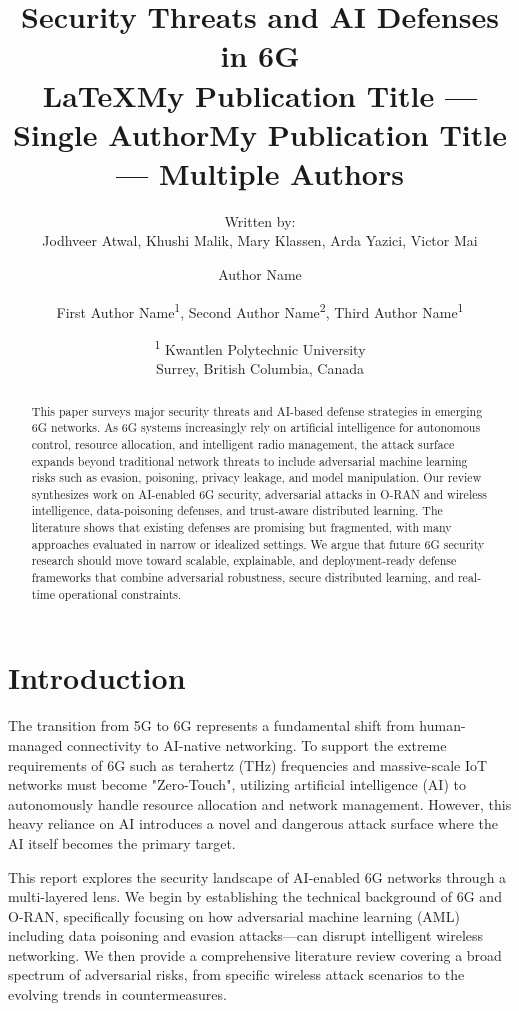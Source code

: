 \documentclass[letterpaper]{article} %
\title{Security Threats and AI Defenses in 6G\\\LaTeX{}}
\author{
    Written by: \\
    Jodhveer Atwal,
    Khushi Malik,
    Mary Klassen,
    Arda Yazici,
    Victor Mai
}
\date{
    \textsuperscript{\rm 1}
}
\title{My Publication Title --- Single Author}
\author {
    Author Name
}
\date{
    Kwantlen Polytechnic University\\
    Surrey, British Columbia, Canada\\
}
\title{My Publication Title --- Multiple Authors}
\author {
    First Author Name\textsuperscript{\rm 1},
    Second Author Name\textsuperscript{\rm 2},
    Third Author Name\textsuperscript{\rm 1}
}
\begin{document}
\maketitle

\begin{abstract}
This paper surveys major security threats and AI-based defense strategies in emerging 6G networks. As 6G systems increasingly rely on artificial intelligence for autonomous control, resource allocation, and intelligent radio management, the attack surface expands beyond traditional network threats to include adversarial machine learning risks such as evasion, poisoning, privacy leakage, and model manipulation. Our review synthesizes work on AI-enabled 6G security, adversarial attacks in O-RAN and wireless intelligence, data-poisoning defenses, and trust-aware distributed learning. The literature shows that existing defenses are promising but fragmented, with many approaches evaluated in narrow or idealized settings. We argue that future 6G security research should move toward scalable, explainable, and deployment-ready defense frameworks that combine adversarial robustness, secure distributed learning, and real-time operational constraints.
\end{abstract}

\section{Introduction}

The transition from 5G to 6G represents a fundamental shift from human-managed connectivity to AI-native networking. To support the extreme requirements of 6G such as terahertz (THz) frequencies and massive-scale IoT networks must become "Zero-Touch", utilizing artificial intelligence (AI) to autonomously handle resource allocation and network management. However, this heavy reliance on AI introduces a novel and dangerous attack surface where the AI itself becomes the primary target.

This report explores the security landscape of AI-enabled 6G networks through a multi-layered lens. We begin by establishing the technical background of 6G and O-RAN, specifically focusing on how adversarial machine learning (AML) including data poisoning and evasion attacks---can disrupt intelligent wireless networking. We then provide a comprehensive literature review covering a broad spectrum of adversarial risks, from specific wireless attack scenarios to the evolving trends in countermeasures.
\end{document}
